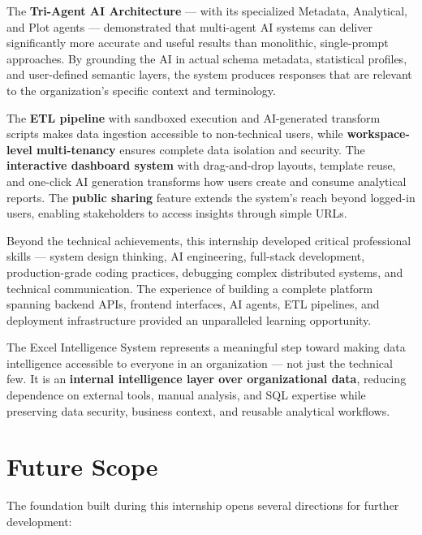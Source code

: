 \documentclass[12pt,a4paper]{report}
\begin{document}
The \textbf{Tri-Agent AI Architecture} --- with its specialized Metadata, Analytical, and Plot agents --- demonstrated that multi-agent AI systems can deliver significantly more accurate and useful results than monolithic, single-prompt approaches. By grounding the AI in actual schema metadata, statistical profiles, and user-defined semantic layers, the system produces responses that are relevant to the organization's specific context and terminology.

The \textbf{ETL pipeline} with sandboxed execution and AI-generated transform scripts makes data ingestion accessible to non-technical users, while \textbf{workspace-level multi-tenancy} ensures complete data isolation and security. The \textbf{interactive dashboard system} with drag-and-drop layouts, template reuse, and one-click AI generation transforms how users create and consume analytical reports. The \textbf{public sharing} feature extends the system's reach beyond logged-in users, enabling stakeholders to access insights through simple URLs.

Beyond the technical achievements, this internship developed critical professional skills --- system design thinking, AI engineering, full-stack development, production-grade coding practices, debugging complex distributed systems, and technical communication. The experience of building a complete platform spanning backend APIs, frontend interfaces, AI agents, ETL pipelines, and deployment infrastructure provided an unparalleled learning opportunity.

The Excel Intelligence System represents a meaningful step toward making data intelligence accessible to everyone in an organization --- not just the technical few. It is an \textbf{internal intelligence layer over organizational data}, reducing dependence on external tools, manual analysis, and SQL expertise while preserving data security, business context, and reusable analytical workflows.

\section{Future Scope}

The foundation built during this internship opens several directions for further development:
\end{document}
